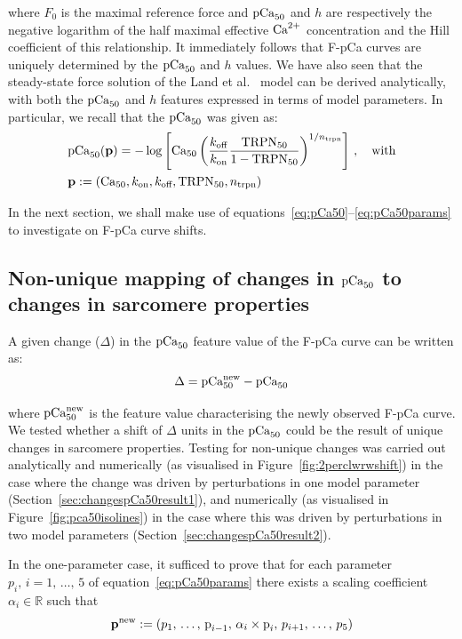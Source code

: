 \noindent
where $F_{0}$ is the maximal reference force and $\textrm{pCa}_{50}$ and $h$ are respectively the negative logarithm of the half maximal effective $\textrm{Ca}^{2+}$ concentration and the Hill coefficient of this relationship. It immediately follows that F-pCa curves are uniquely determined by the $\textrm{pCa}_{50}$ and $h$ values. We have also seen that the steady-state force solution of the Land et al.~\cite{Land:2012} model can be derived analytically, with both the $\textrm{pCa}_{50}$ and $h$ features expressed in terms of model parameters. In particular, we recall that the $\textrm{pCa}_{50}$ was given as:
%
\begin{align}
    & \textrm{pCa}_{50}(\mathbf{p}) =  -\log\left[\textrm{Ca}_{50}\left(\frac{k_{\textrm{off}}}{k_{\textrm{on}}}\frac{\textrm{TRPN}_{50}}{1-\textrm{TRPN}_{50}}\right)^{1/n_{\textrm{trpn}}}\right]\,,\quad\text{with} \label{eq:pCa50}\\
    & \mathbf{p} := (\textrm{Ca}_{50}, k_{\textrm{on}}, k_{\textrm{off}}, \textrm{TRPN}_{50}, n_{\textrm{trpn}}) \label{eq:pCa50params}
\end{align}

\vspace{0.2cm}\noindent
In the next section, we shall make use of equations~\eqref{eq:pCa50}--\eqref{eq:pCa50params} to investigate on F-pCa curve shifts. 


%
%
%
\subsection{Non-unique mapping of changes in $\textrm{pCa}_{50}$ to changes in sarcomere properties}\label{sec:changespCa50}
A given change ($\Delta$) in the $\textrm{pCa}_{50}$ feature value of the F-pCa curve can be written as:
%
\begin{equation}\label{eq:delta}
    \Delta = \textrm{pCa}_{50}^{\text{new}} - \textrm{pCa}_{50}
\end{equation}

\vspace{0.2cm}\noindent
where $\textrm{pCa}_{50}^{\text{new}}$ is the feature value characterising the newly observed F-pCa curve. We tested whether a shift of $\Delta$ units in the $\textrm{pCa}_{50}$ could be the result of unique changes in sarcomere properties. Testing for non-unique changes was carried out analytically and numerically (as visualised in Figure~\ref{fig:2perclwrwshift}) in the case where the change was driven by perturbations in one model parameter (Section~\ref{sec:changespCa50result1}), and numerically (as visualised in Figure~\ref{fig:pca50isolines}) in the case where this was driven by perturbations in two model parameters (Section~\ref{sec:changespCa50result2}).

\vspace{0.2cm}
In the one-parameter case, it sufficed to prove that for each parameter $p_i,\,i=1,\,\dots,\,5$ of equation~\eqref{eq:pCa50params} there exists a scaling coefficient $\alpha_i\in\mathbb{R}$ such that
%
\begin{equation}
    \mathbf{p}^{\text{new}} := (p_1,\,\dots,\,\textrm{p}_{i-1},\,\alpha_i\times\textrm{p}_i,\,p_{i+1},\,\dots,\,p_5)
\end{equation}


